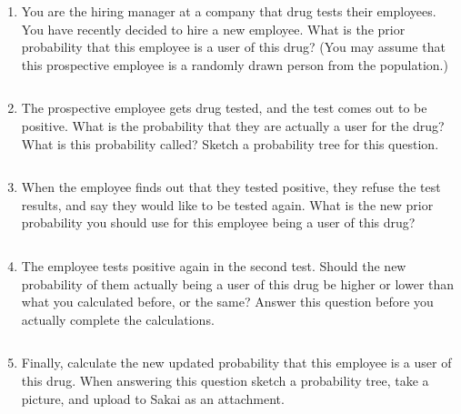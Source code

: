 \documentclass[12pt]{article}
\newcommand{\soln}[2]{$\:$\\ \vspace{#1}}{}
\begin{document}
\begin{enumerate}

\item You are the hiring manager at a company that drug tests their employees. You have recently decided to hire a new employee. What is the prior probability that this employee is a user of this drug? (You may assume that this prospective employee is a randomly drawn person from the population.)

\soln{1cm}{P(drug user) = 0.05}

\item The prospective employee gets drug tested, and the test comes out to be positive. What is the probability that they are actually a user for the drug? What is this probability called? Sketch a probability tree for this question.

\soln{6cm}{P(drug user $|$ +) $\rightarrow$ posterior probability\\
\begin{minipage}[c]{0.7\textwidth}
\texttt{[image: figures/test1.pdf]}
\end{minipage}
\begin{minipage}[c]{0.3\textwidth}
\begin{align*}
&P(drug~user~|~+) \\
&= \frac{P(drug~user~AND~+)}{P(+)} \\
&= \frac{0.0485}{0.0485 + 0.076} \\
&\approx 0.39
\end{align*}
\end{minipage}
}

\item When the employee finds out that they tested positive, they refuse the test results, and say they would like to be tested again. What is the new prior probability you should use for this employee being a user of this drug?

\soln{1cm}{P(drug user) = 0.39}

\item The employee tests positive again in the second test. Should the new probability of them actually being a user of this drug be higher or lower than what you calculated before, or the same? Answer this question before you actually complete the calculations.

\soln{1cm}{Higher.}

\item Finally, calculate the new updated probability that this employee is a user of this drug. When answering this question sketch a probability tree, take a picture, and upload to Sakai as an attachment.


\end{enumerate}
\end{document}
